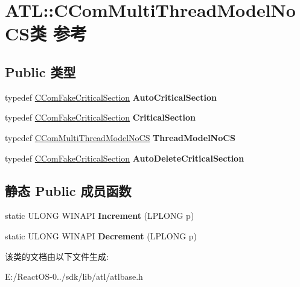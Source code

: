 \hypertarget{class_a_t_l_1_1_c_com_multi_thread_model_no_c_s}{}\section{A\+TL\+:\+:C\+Com\+Multi\+Thread\+Model\+No\+C\+S类 参考}
\label{class_a_t_l_1_1_c_com_multi_thread_model_no_c_s}
\subsection*{Public 类型}
\begin{DoxyCompactItemize}
\item 
\mbox{\label{class_a_t_l_1_1_c_com_multi_thread_model_no_c_s_a251ebeff6eda050847192df16e5f6b4e}} 
typedef \hyperlink{class_a_t_l_1_1_c_com_fake_critical_section}{C\+Com\+Fake\+Critical\+Section} {\bfseries Auto\+Critical\+Section}
\item 
\mbox{\label{class_a_t_l_1_1_c_com_multi_thread_model_no_c_s_adc792f0f436373c52b595ce730e8d25d}} 
typedef \hyperlink{class_a_t_l_1_1_c_com_fake_critical_section}{C\+Com\+Fake\+Critical\+Section} {\bfseries Critical\+Section}
\item 
\mbox{\label{class_a_t_l_1_1_c_com_multi_thread_model_no_c_s_a5656ee2e9ebd368c4c14fc56ab3c2b1b}} 
typedef \hyperlink{class_a_t_l_1_1_c_com_multi_thread_model_no_c_s}{C\+Com\+Multi\+Thread\+Model\+No\+CS} {\bfseries Thread\+Model\+No\+CS}
\item 
\mbox{\label{class_a_t_l_1_1_c_com_multi_thread_model_no_c_s_af4f7348db9f09e7f455b3174070c245a}} 
typedef \hyperlink{class_a_t_l_1_1_c_com_fake_critical_section}{C\+Com\+Fake\+Critical\+Section} {\bfseries Auto\+Delete\+Critical\+Section}
\end{DoxyCompactItemize}
\subsection*{静态 Public 成员函数}
\begin{DoxyCompactItemize}
\item 
\mbox{\label{class_a_t_l_1_1_c_com_multi_thread_model_no_c_s_a7496c77cdfa2cdf9ef999e3a23e9acbb}} 
static U\+L\+O\+NG W\+I\+N\+A\+PI {\bfseries Increment} (L\+P\+L\+O\+NG p)
\item 
\mbox{\label{class_a_t_l_1_1_c_com_multi_thread_model_no_c_s_aa1d92ced8880e21ee2f6543537ab4a84}} 
static U\+L\+O\+NG W\+I\+N\+A\+PI {\bfseries Decrement} (L\+P\+L\+O\+NG p)
\end{DoxyCompactItemize}


该类的文档由以下文件生成\+:\begin{DoxyCompactItemize}
\item 
E\+:/\+React\+O\+S-\/0../sdk/lib/atl/atlbase.\+h\end{DoxyCompactItemize}
